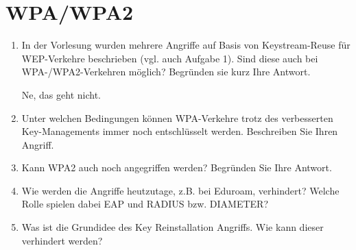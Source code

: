 \documentclass[12pt,a4paper]{article}
\newenvironment{exercise}
	{\begin{enumerate}[label=\bfseries\alph*).]\bfseries}
{\end{enumerate}}
\newenvironment{answer}{\par\normalfont}{}
\begin{document}
    \section{WPA/WPA2}
    	\begin{exercise}
    		\item In der Vorlesung wurden mehrere Angriffe auf Basis von Keystream-Reuse für WEP-Verkehre beschrieben (vgl. auch Aufgabe 1). Sind diese auch bei WPA-/WPA2-Verkehren möglich? Begründen sie kurz Ihre Antwort.
    			\begin{answer}
    				Ne, das geht nicht.
    			\end{answer}
    		\item Unter welchen Bedingungen können WPA-Verkehre trotz des verbesserten Key-Managements immer noch entschlüsselt werden. Beschreiben Sie Ihren Angriff.
    		\item Kann WPA2 auch noch angegriffen werden? Begründen Sie Ihre Antwort.
    		\item Wie werden die Angriffe heutzutage, z.B. bei Eduroam, verhindert? Welche Rolle spielen dabei EAP und RADIUS bzw. DIAMETER?
    		\item Was ist die Grundidee des Key Reinstallation Angriffs. Wie kann dieser verhindert werden?
    		
    	\end{exercise}
\end{document}

